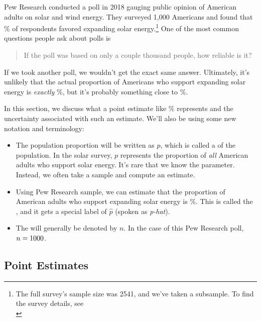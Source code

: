 Pew Research conducted a poll in 2018 gauging public opinion of
American adults on solar and wind energy. They surveyed 1,000
Americans and found that \pewsolarpollpercent{}\% of respondents
favored expanding
solar energy.\footnote{The full survey's sample size was 2541,
and we've taken a subsample. To find the survey details, see\\
}
One of the most common questions people ask about polls is
\begin{quote}
If the poll was based on only a couple thousand people, how reliable is it?
\end{quote}
If we took another poll, we wouldn't get the exact same answer.
Ultimately, it's unlikely that the actual proportion of Americans
who support expanding solar energy is \emph{exactly}
\pewsolarpollpercent{}\%, but it's probably something close to
\pewsolarpollpercent{}\%.

In this section, we discuss what a point estimate like
\pewsolarpollpercent{}\% represents
and the uncertainty associated with such an estimate. We'll also
be using some new notation and terminology:
\begin{itemize}
\item The population proportion will be written as $p$, which
    is called a  of the population. In the solar
    survey, $p$ represents the proportion of \emph{all}
    American adults who support solar energy. It's rare
    that we know the parameter. Instead, we often
    take a sample and compute an estimate.
\item Using Pew Research sample, we can estimate that the proportion
    of American adults who support expanding solar energy is
    \pewsolarpollpercent{}\%.
    This is called the , and it gets a special
    label of $\hat{p}$ (spoken as \emph{p-hat}).
\item The  will generally
    be denoted by $n$. In the case of this Pew Research poll,
    $n = 1000{}$.
\end{itemize}

\subsection{Point Estimates}

